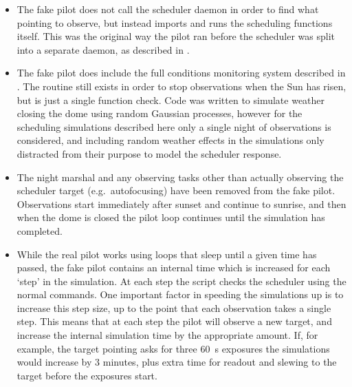 \begin{colsection}
\begin{itemize}
    \item The fake pilot does not call the scheduler daemon in order to find what pointing to observe, but instead imports and runs the scheduling functions itself. This was the original way the pilot ran before the scheduler was split into a separate daemon, as described in .
    \item The fake pilot does include the full conditions monitoring system described in . The  routine still exists in order to stop observations when the Sun has risen, but is just a single function check. Code was written to simulate weather closing the dome using random Gaussian processes, however for the scheduling simulations described here only a single night of observations is considered, and including random weather effects in the simulations only distracted from their purpose to model the scheduler response.
    \item The night marshal and any observing tasks other than actually observing the scheduler target (e.g.\ autofocusing) have been removed from the fake pilot. Observations start immediately after sunset and continue to sunrise, and then when the dome is closed the pilot loop continues until the simulation has completed.
    \item While the real pilot works using loops that sleep until a given time has passed, the fake pilot contains an internal time which is increased for each `step' in the simulation. At each step the script checks the scheduler using the normal commands. One important factor in speeding the simulations up is to increase this step size, up to the point that each observation takes a single step. This means that at each step the pilot will observe a new target, and increase the internal simulation time by the appropriate amount. If, for example, the target pointing asks for three \SI{60}{\second} exposures the simulations would increase by 3 minutes, plus extra time for readout and slewing to the target before the exposures start.
\end{itemize}

\newpage

\end{colsection}


